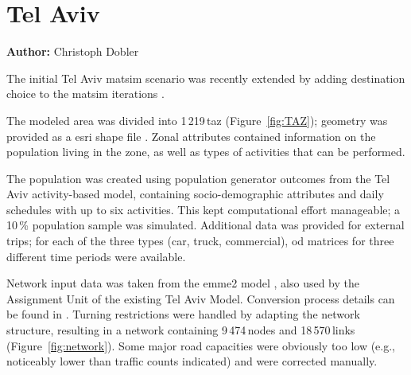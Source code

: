 \section{Tel Aviv}
\label{sec:telaviv}
\hfill \textbf{Author:} Christoph Dobler


The initial Tel Aviv \gls{matsim} scenario \citep[][]{BekhorEtAl_TRB_2011} was recently extended by adding destination choice to the \gls{matsim} iterations \citep[][]{DoblerEtAl_TechRep_IVT_2014}.

The modeled area was divided into 1\,219\,\gls{taz} (Figure~\ref{fig:TAZ}); geometry was provided as a \gls{esri} shape file \citep{ESRI-ShapeFile_manual_1998}. Zonal attributes contained information on the population living in the zone, as well as types of activities that can be performed.

The population was created using population generator outcomes from the Tel Aviv activity-based model, containing socio-demographic attributes and daily schedules with up to six activities. This kept computational effort manageable; a 10\,\% population sample was simulated. Additional data was provided for external trips; for each of the three types (car, truck, commercial), \gls{od} matrices for three different time periods were available.

Network input data was taken from the \gls{emme2} model \citep[see][]{EMME_Webpage_2011}, also used by the Assignment Unit of the existing Tel Aviv Model. Conversion process details can be found in \citet{GaoWEtAl_TRR_2010}. Turning restrictions were handled by adapting the network structure, resulting in a network containing 9\,474\,nodes and 18\,570\,links (Figure~\ref{fig:network}). Some major road capacities were obviously too low (e.g.,\,noticeably lower than traffic counts indicated) and were corrected manually.

